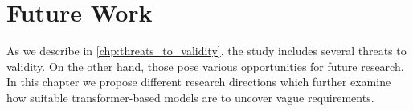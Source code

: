 \chapter{Future Work}
\label{chp:future_work}
As we describe in \cref{chp:threats_to_validity}, the study includes several threats to validity.
On the other hand, those pose various opportunities for future research.
In this chapter we propose different research directions which further examine how suitable transformer-based models are to uncover vague requirements.





